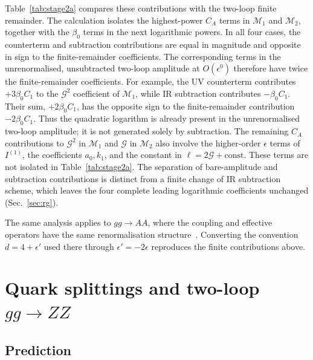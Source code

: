 \documentclass[%
 onecolumn,
 superscriptaddress,
 preprintnumbers,
 nofootinbib,
 amsmath,amssymb,
 aps,
 prl,
]{revtex4-2}
\newcommand{\G}{\mathcal G}
\newcommand{\M}{\mathcal M}
\begin{document}
Table~\ref{tab:stage2a} compares these
contributions with the two-loop finite
remainder. The calculation isolates the
highest-power $C_A$ terms in $\M_1$ and
$\M_2$, together with the $\beta_0$ terms
in the next logarithmic powers. In all
four cases, the counterterm and subtraction
contributions are equal in magnitude and
opposite in sign to the finite-remainder
coefficients. The corresponding terms in
the unrenormalised, unsubtracted two-loop
amplitude at $O(\epsilon^0)$ therefore
have twice the finite-remainder coefficients.
%
For example, the UV counterterm
contributes $+3\beta_0C_1$ to the
$\G^2$ coefficient of $\M_1$, while
IR subtraction contributes
$-\beta_0C_1$. Their sum,
$+2\beta_0C_1$, has the opposite sign
to the finite-remainder contribution
$-2\beta_0C_1$. Thus the quadratic
logarithm is already present in the
unrenormalised two-loop amplitude;
it is not generated solely by subtraction.
%
The remaining $C_A$ contributions to
$\G^2$ in $\M_1$ and $\G$ in $\M_2$
also involve the higher-order
$\epsilon$ terms of $I^{(1)}$,
the coefficients $a_0,k_1$, and the
constant in $\ell=2\G+\text{const}$.
These terms are not isolated in
Table~\ref{tab:stage2a}. The separation
of bare-amplitude and subtraction
contributions is distinct from a finite
change of IR subtraction scheme,
which leaves the four complete leading
logarithmic coefficients unchanged
(Sec.~\ref{sec:rg}).

The same analysis applies to $gg\to AA$,
where the coupling and effective operators
have the same renormalisation structure~\cite{P1}. Converting the convention
$d=4+\epsilon'$ used there through
$\epsilon'=-2\epsilon$ reproduces
the finite contributions above.





\section{Quark splittings and two-loop \texorpdfstring{$gg\to ZZ$}{gg -> ZZ}}
\label{sec:quarks}

\subsection{Prediction}
\label{sec:quarkpred}
\end{document}
